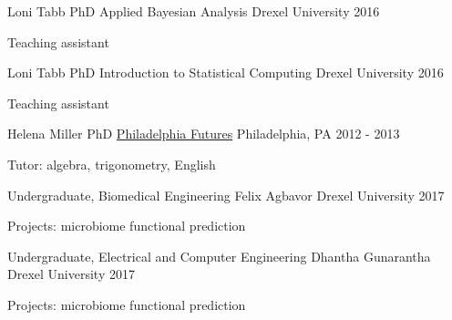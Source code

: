 \begin{cventries}
\cventry
    {Loni Tabb PhD}
    {Applied Bayesian Analysis}
    {Drexel University}
    {2016}
    {\begin{cvitems}
        \item Teaching assistant
    \end{cvitems}}
    
\cventry
    {Loni Tabb PhD}
    {Introduction to Statistical Computing}
    {Drexel University}
    {2016}
    {\begin{cvitems}
        \item Teaching assistant
    \end{cvitems}}
    
\cventry
    {Helena Miller PhD}
    {\href{https://philadelphiafutures.org/}{Philadelphia Futures}}
    {Philadelphia, PA}
    {2012 - 2013}
    {\begin{cvitems}
        \item Tutor: algebra, trigonometry, English 
    \end{cvitems}}

\end{cventries}


\begin{cventries}

\cventry
    {Undergraduate, Biomedical Engineering}
    {Felix Agbavor}
    {Drexel University}
    {2017}
    {\begin{cvitems}
        \item Projects: microbiome functional prediction
    \end{cvitems}}

\cventry
    {Undergraduate, Electrical and Computer Engineering}
    {Dhantha Gunarantha}
    {Drexel University}
    {2017}
    {\begin{cvitems}
        \item Projects: microbiome functional prediction
    \end{cvitems}}
    
\end{cventries}
    



